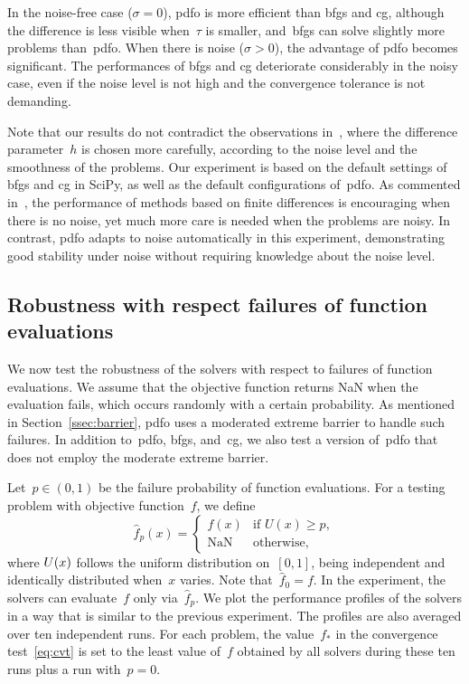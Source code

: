 \documentclass[
    smallextended,  %
    final,          %
]{svjour3}
\newcommand{\iter}[1][k]{x\ifthenelse{\equal{#1}{}}{}{_{#1}}}
\newcommand{\obj}{f}
\begin{document}
In the noise-free case ($\sigma = 0$), \gls{pdfo} is more efficient than
\gls{bfgs} and \gls{cg}, although the difference is less visible when~$\tau$ is
smaller, and~\gls{bfgs} can solve slightly more problems than~\gls{pdfo}.
When there is noise ($\sigma >0$), the advantage of \gls{pdfo} becomes significant.
The performances of \gls{bfgs} and \gls{cg} deteriorate considerably in the noisy case, even if the
noise level is not high and the convergence tolerance is not demanding.

Note that our results do not contradict the observations in~\cite{Shi_Etal_2022}, where the difference parameter~$h$ is chosen more carefully, according to the noise level and the smoothness of the problems.
Our experiment is based on the default settings of \gls{bfgs} and \gls{cg} in SciPy, as well as the default configurations of~\gls{pdfo}.
As commented in~\cite[\S~2]{Shi_Etal_2022}, the performance of methods based on finite differences is encouraging when there is no noise, yet much more care is needed when the problems are noisy.
In contrast, \gls{pdfo} adapts to noise automatically in this experiment, demonstrating good stability under noise
without requiring knowledge about the noise level.


\subsection{Robustness with respect failures of function evaluations}
\label{sssec:nan}

We now test the robustness of the solvers with respect to failures of function evaluations.
We assume that the objective function returns NaN when the evaluation fails, which occurs randomly
with a certain probability. As mentioned in Section~\ref{ssec:barrier}, \gls{pdfo} uses a moderated extreme
barrier to handle such failures.
In addition to~\gls{pdfo}, \gls{bfgs}, and~\gls{cg}, we also test a version of~\gls{pdfo} that
does not employ the moderate extreme barrier.

Let~$p \in (0,1)$ be the failure probability of function evaluations.
For a testing problem with objective function~$\obj$, we define
\begin{equation}
    \label{eq:nan-obj}
    \hat{\obj}_p(x) = \begin{cases}
        \obj(x) & \text{if~$U(x) \ge  p$}, \\
        \text{NaN} & \text{otherwise},
    \end{cases}
\end{equation}
where $U(\iter[])$ follows the uniform distribution on~$[0,1]$, being independent and identically distributed when~$x$ varies.
Note that~$\hat{\obj}_0 = f$.
In the experiment, the solvers can evaluate~$\obj$ only via~$\hat{\obj}_p$.
We plot the performance profiles of the solvers in a way that is similar to the previous experiment.
The profiles are also averaged over ten independent runs. For each problem, the
value~$\obj_{\ast}$ in the convergence test~\eqref{eq:cvt} is set to the least value of~$\obj$ obtained
by all solvers during these ten runs plus a run with~$p = 0$.
\end{document}
